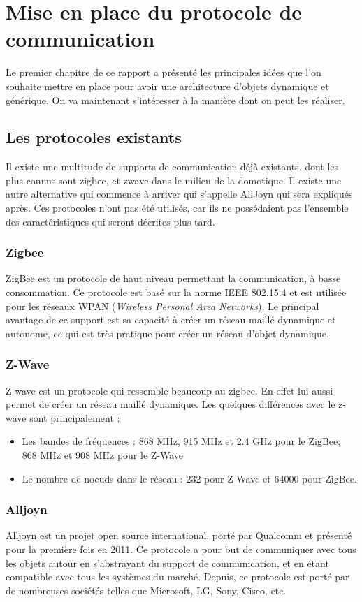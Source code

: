 ﻿\chapter{Mise en place du protocole de communication}
	Le premier chapitre de ce rapport a présenté les principales idées que l'on souhaite mettre en 
	place pour avoir une architecture d'objets dynamique et générique. On va maintenant s'intéresser
	à la manière dont on peut les réaliser.


\section{Les protocoles existants}
	Il existe une multitude de supports de communication déjà existants, dont les plus connus sont 
	zigbee, et zwave dans le milieu de la domotique. Il existe une autre alternative qui commence à 
	arriver qui s'appelle AllJoyn qui sera expliqués après. Ces protocoles n'ont pas été utilisés, 
	car ils ne possédaient pas l'ensemble des caractéristiques qui seront décrites plus tard. 

	\subsection{Zigbee}
		ZigBee est un protocole de haut niveau permettant la communication, à basse consommation. Ce 
		protocole est basé sur la norme IEEE 802.15.4 et est utilisée pour les réseaux WPAN 
		(\emph{Wireless Personal 
		Area Networks}). Le principal avantage de ce support est sa capacité à créer un réseau 
		maillé dynamique et autonome, ce qui est très pratique pour créer un réseau d'objet dynamique.
		
	\subsection{Z-Wave}
	Z-wave est un protocole qui ressemble beaucoup au zigbee. En effet lui aussi permet de créer un 
	réseau maillé dynamique. Les quelques différences avec le z-wave sont principalement :

\begin{itemize}
 \item Les bandes de fréquences : 868 MHz, 915 MHz et 2.4 GHz pour le ZigBee; 868 MHz et 908 MHz pour le 
Z-Wave
\item Le nombre de noeuds dans le réseau : 232 pour Z-Wave et 64000 pour ZigBee.
\end{itemize}

	\subsection{Alljoyn}
	Alljoyn est un projet open source international, porté par Qualcomm et présenté pour la première fois en 2011. Ce protocole a pour but de communiquer avec tous les objets autour en s'abstrayant du support de communication, et en étant compatible avec tous les systèmes du marché. Depuis, ce protocole est porté par de nombreuses sociétés telles que Microsoft, LG, Sony, Cisco, etc.

